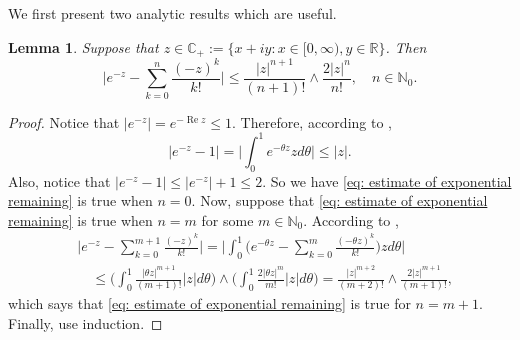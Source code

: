\documentclass[12pt, a4paper]{amsart}
\newtheorem{lem}[thm]{Lemma}
\theoremstyle{definition}
\numberwithin{equation}{section}
\begin{document}
\subsection{}
    We first present two analytic results which are useful.
\begin{lem}
\label{lem: estimate of exponential remaining}
	Suppose that $z\in \mathbb C_+:= \{x+iy: x \in [0,\infty), y \in \mathbb R\}$. Then
\begin{equation}
\label{eq: estimate of exponential remaining}
	\Big|e^{-z} - \sum_{k=0}^n \frac{(-z)^k}{k!} \Big|
	\leq \frac{|z|^{n+1}}{(n+1)!} \wedge \frac{2|z|^{n}}{n!}, \quad n\in \mathbb N_0.
\end{equation}
\end{lem}
\begin{proof}
	Notice that $|e^{-z}| = e^{- \operatorname{Re} z} \leq 1$.
	Therefore, according to \cite[Theorem 7.20.]{Rudin1987Real},
\begin{equation}
	|e^{-z} - 1| = \Big| \int_0^1 e^{-\theta z} z d\theta\Big|
	\leq |z|.
\end{equation}
	Also, notice that $|e^{-z} - 1| \leq |e^{-z}|+1 \leq 2$.
	So we have \eqref{eq: estimate of exponential remaining} is true when $n = 0$.
	Now, suppose that \eqref{eq: estimate of exponential remaining} is true when $n = m$ for some $m \in \mathbb N_0$.
	According to \cite[Theorem 7.20.]{Rudin1987Real},
\begin{align}
	&\Big|e^{-z} - \sum_{k=0}^{m+1} \frac{(-z)^k}{k!}\Big|
	= \Big| \int_0^1\Big(e^{-\theta z} - \sum_{k=0}^m \frac{(-\theta z)^k}{k!} \Big) z d\theta \Big|
    \\&\quad \leq  \Big(\int_0^1 \frac{|\theta z|^{m+1}}{(m+1)!} |z| d\theta\Big) \wedge \Big(\int_0^1 \frac{2|\theta z|^{m}}{m!} |z| d\theta\Big)
	= \frac{|z|^{m+2}}{(m+2)!} \wedge \frac{2|z|^{m+1}}{(m+1)!},
\end{align}
	which says that \eqref{eq: estimate of exponential remaining} is true for $n = m + 1$.
	Finally, use induction.
\end{proof}
\end{document}
